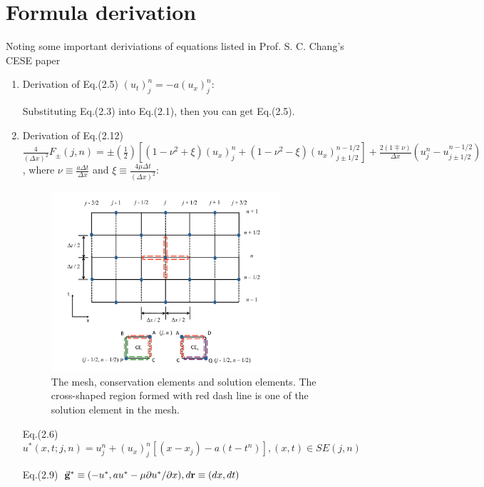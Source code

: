 \documentclass[a4paper,12pt]{article}
\begin{document}
\section{Formula derivation}
 \label{sec:formula_derivation}
Noting some important deriviations of equations listed in Prof. S. C. Chang's CESE paper~\cite{CESE_Shin_Chung_Chang_1995}
 \begin{enumerate}
  \item Derivation of Eq.(2.5) $(u_t)^n_j = -a(u_x)^n_j$:

        \hspace{4mm}Substituting Eq.(2.3) into Eq.(2.1), then you can get Eq.(2.5).

  \item Derivation of Eq.(2.12) $\frac{4}{(\Delta x)^{2}}F_{\pm}(j, n)=\pm(\frac{1}{2})[(1-\nu^{2}+\xi)(u_{x})^{n}_{j}+(1-\nu^{2}-\xi)(u_{x})^{n-1/2}_{j\pm1/2}]+\frac{2(1\mp\nu)}{\Delta x}(u^{n}_{j}-u^{n-1/2}_{j\pm1/2})$, where $\nu\equiv\frac{a\Delta t}{\Delta x}$ and $\xi\equiv\frac{4\mu\Delta t}{(\Delta x)^{2}}$:
        \begin{figure}[hbtp]
          \centering
            \includegraphics[width=0.8\textwidth]{mesh_and_ce_se_v1.pdf}
            \caption{The mesh, conservation elements and solution elements. The cross-shaped region formed with red dash line is one of the solution element in the mesh.}
          \label{fig:mesh_and_ce_se_v1}
        \end{figure}

        \hspace{4mm}Eq.(2.6) $u^{*}(x,t;j,n)=u^{n}_{j}+(u_{x})^{n}_{j}[(x-x_{j})-a(t-t^{n})], (x,t)\in SE(j,n)$

        \hspace{4mm}Eq.(2.9) $\vec{\bf{g}}^{*}\equiv(-u^{*},au^{*}-\mu\partial u^{*}/\partial x), d{\bf{r}}\equiv(dx,dt)$


\end{enumerate}
\end{document}
